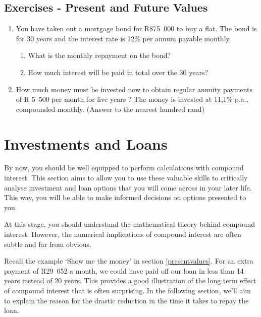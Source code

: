 
\subsection{Exercises - Present and Future Values}
\begin{enumerate}
\item{You have taken out a mortgage bond for R875~000 to buy a flat. The bond is for 30 years and the interest rate is 12\% per annum payable monthly.
\begin{enumerate}
\item What is the monthly repayment on the bond?
\item How much interest will be paid in total over the 30 years?
\end{enumerate}}
\item{How much money must be invested now to obtain regular annuity payments of R 5~500 per month for five years ?  The money is invested at 11,1\% p.a., compounded monthly. (Answer to the nearest hundred rand)}
\end{enumerate}

\section{Investments and Loans}
\label{s:investmentandloans}

By now, you should be well equipped to perform calculations with compound interest. This section aims to allow you to use these valuable skills to critically analyse investment and loan options that you will come across in your later life. This way, you will be able to make informed decisions on options presented to you.

At this stage, you should understand the mathematical theory behind compound interest. However, the numerical implications of compound interest are often subtle and far from obvious.

Recall the example `Show me the money' in section \ref{presentvalues}. For an extra payment of R29~052 a month, we could have paid off our loan in less than 14 years instead of 20 years. This provides a good illustration of the long term effect of compound interest that is often surprising. In the following section, we'll aim to explain the reason for the drastic reduction in the time it takes to repay the loan.

